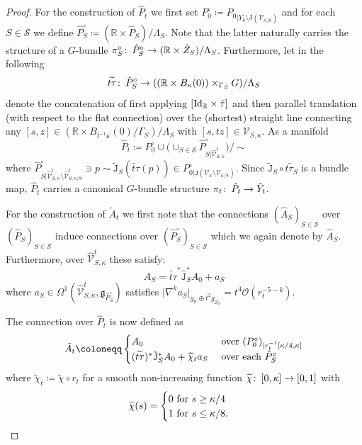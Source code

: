 \documentclass[11pt,a4paper]{scrartcl}
\newcommand{\col}{\colon \thinspace}
\numberwithin{equation}{section}
\theoremstyle{plain}
\theoremstyle{definition}
\theoremstyle{remark}
\begin{document}
\begin{proof}
For the construction of $\hat{P}_t$ we first set $P_0^\circ \coloneqq {P_{0}}_{\vert Y_0 \setminus \mathrm{J}(\mathcal{V}_{\kappa/8})}$ and for each $S\in \mathcal{S}$ we define $\hat{P}^\circ_S \coloneqq (\mathbb{R} \times \hat{P}_S)/\Lambda_S$. Note that the latter naturally carries the structure of a $G$-bundle $\pi^\circ_S \col \hat{P}^\circ_S \to (\mathbb{R}\times \hat{Z}_S)/\Lambda_S$. Furthermore, let in the following \[ \widetilde{t \tau} \col \hat{P}_S^\circ \to ((\mathbb{R}\times B_{\kappa}(0))\times_{\Gamma_S} G)/\Lambda_S \] denote the concatenation of first applying $[\textup{Id}_{\mathbb{R}}\times\tilde{\tau}]$ and then parallel translation (with respect to the flat connection) over the (shortest) straight line connecting any $[s,z]\in (\mathbb{R}\times B_{t^{-1}\kappa}(0)/\Gamma_S)/\Lambda_S$ with $[s,tz]\in \mathcal{V}_{S,\kappa}$. As a manifold \[ \hat{P}_t \coloneqq P_0^\circ \cup \big(\cup_{S\in \mathcal{S}} \hat{P}^\circ_{S\vert \hat{\mathcal{V}}_{S,\kappa}^t} \big)/\sim \] where $\hat{P}^\circ_{S\vert \hat{\mathcal{V}}_{S,\kappa}^t\setminus \hat{\mathcal{V}}^t_{S,\kappa/8}} \ni p \sim \tilde{\mathtt{J}}_S(\widetilde{t\tau}(p)) \in P^\circ_{0 \vert \mathtt{J}(\mathcal{V}_{\kappa}\setminus \mathcal{V}_{\kappa/8})}$. Since $\tilde{\mathtt{J}}_S \circ \widetilde{t\tau_S}$ is a bundle map, $\hat{P}_t$ carries a canonical $G$-bundle structure $\pi_t \col \hat{P}_t \to \hat{Y}_t$.

For the construction of $\tilde{A}_t$ we first note that the connections $(\hat{A}_S)_{S\in \mathcal{S}}$ over $(\hat{P}_S)_{S\in \mathcal{S}}$ induce connections over $(\hat{P}^\circ_S)_{S\in\mathcal{S}}$ which we again denote by $\hat{A}_S$. Furthermore, over $\hat{\mathcal{V}}_{S,\kappa}^t$ these satisfy: \[ \hat{A}_S =  \widetilde{t \tau}^*\hat{\mathtt{J}}_S^* A_0 + a_S  \] where $a_S \in \Omega^1(\hat{\mathcal{V}}^t_{S,\kappa}, \mathfrak{g}_{\hat{P}^\circ_S})$ satisfies $\vert \nabla^k a_S \vert_{g_\mathbb{R} \oplus t^2 g_{\hat{Z}_S}} = t^4 \mathcal{O}(r_t^{-5-k}).$

The connection over $\hat{P}_t$ is now defined as
\begin{align*}
\tilde{A}_t \coloneqq 
\begin{cases}
A_0 &\textup{ over $(P_0^\circ)_{\vert r_t^{-1}[\kappa/4,\kappa]}$} \\
(\widetilde{t \tau})^*\tilde{\mathtt{J}}_S^* A_0 + \widetilde{\chi}_t a_S &\textup{ over each $\hat{P}^\circ_S$}
\end{cases}
\end{align*} 
where $\widetilde{\chi}_t \coloneqq \widetilde{\chi} \circ r_t$ for a smooth non-increasing function $\widetilde{\chi} \col [0,\kappa] \to [0,1]$ with 
\begin{align*}
\widetilde{\chi}(s) = \begin{cases}
0 \textup{ for $s \geq \kappa/4$}\\
1 \textup{ for $s \leq \kappa/8$.}
\end{cases}
\end{align*}


\end{proof}
\end{document}
